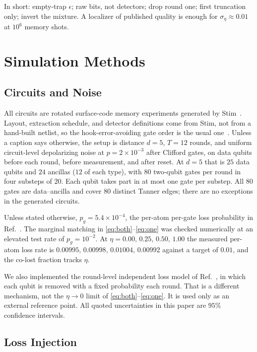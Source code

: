 \documentclass{ieeeaccess}
\begin{document}
In short: empty-trap $\epsilon$; raw bits, not detectors; drop round one; first truncation
only; invert the mixture. A localizer of published quality is enough for
$\sigma_\eta \approx 0.01$ at $10^{6}$ memory shots.


\section{Simulation Methods}
\label{sec:methods}

\subsection{Circuits and Noise}
\label{sec:methods-circuit}

All circuits are rotated surface-code memory experiments generated by
Stim~\cite{gidney2021stim}. Layout, extraction schedule, and detector
definitions come from Stim, not from a hand-built netlist, so the
hook-error-avoiding gate order is the usual
one~\cite{tomita2014lowdistancesurfacecodes}. Unless a caption says otherwise,
the setup is distance $d=5$, $T=12$ rounds, and uniform circuit-level
depolarizing noise at $p=2\times10^{-3}$ after Clifford gates, on data qubits
before each round, before measurement, and after reset. At $d=5$ that is $25$
data qubits and $24$ ancillas ($12$ of each type), with $80$ two-qubit gates
per round in four substeps of $20$. Each qubit takes part in at most one gate
per substep. All $80$ gates are data--ancilla and cover $80$ distinct Tanner
edges; there are no exceptions in the generated circuits.

Unless stated otherwise, $p_g=5.4\times10^{-4}$, the per-atom per-gate loss
probability in Ref.~\cite{evered2026highfidelitygates}. The marginal matching
in \eqref{eq:both}--\eqref{eq:one} was checked numerically at an elevated test rate of $p_g=10^{-2}$. At
$\eta=0.00,\,0.25,\,0.50,\,1.00$ the measured per-atom loss rate is
$0.00995,\,0.00998,\,0.01004,\,0.00992$ against a target of $0.01$, and the
co-lost fraction tracks $\eta$.

We also implemented the round-level independent loss model of
Ref.~\cite{wang2026aiqubitloss}, in which each qubit is removed with a fixed
probability each round. That is a different mechanism, not the $\eta\to 0$
limit of \eqref{eq:both}--\eqref{eq:one}. It is used only as an external
reference point. All quoted uncertainties in this paper are $95\%$ confidence intervals.

\subsection{Loss Injection}
\label{sec:methods-injection}
\end{document}

